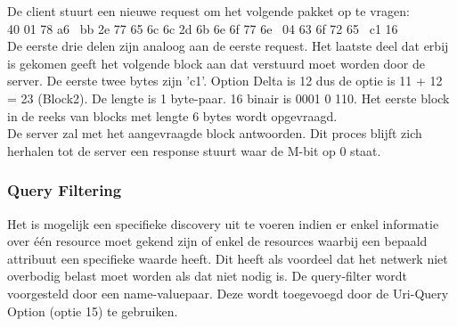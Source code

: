 \noindent
De client stuurt een nieuwe request om het volgende pakket op te vragen:\\
40 01 78 a6 \textbar~bb 2e 77 65 6c 6c 2d 6b 6e 6f 77 6e \textbar~04 63 6f 72 65 \textbar~c1 16\\
De eerste drie delen zijn analoog aan de eerste request. Het laatste deel dat erbij is gekomen geeft het volgende block aan dat verstuurd moet worden door de server. De eerste twee bytes zijn 'c1'. Option Delta is 12 dus de optie is 11 + 12 = 23 (Block2). De lengte is 1 byte-paar. 16 binair is 0001 0 110. Het eerste block in de reeks van blocks met lengte 6 bytes wordt opgevraagd.\\

\noindent
De server zal met het aangevraagde block antwoorden. Dit proces blijft zich herhalen tot de server een response stuurt waar de M-bit op 0 staat.

\subsubsection{Query Filtering}
Het is mogelijk een specifieke discovery uit te voeren indien er enkel informatie over één resource moet gekend zijn of enkel de resources waarbij een bepaald attribuut een specifieke waarde heeft. Dit heeft als voordeel dat het netwerk niet overbodig belast moet worden als dat niet nodig is. De query-filter wordt voorgesteld door een name-valuepaar. Deze wordt toegevoegd door de Uri-Query Option (optie 15) te gebruiken.

